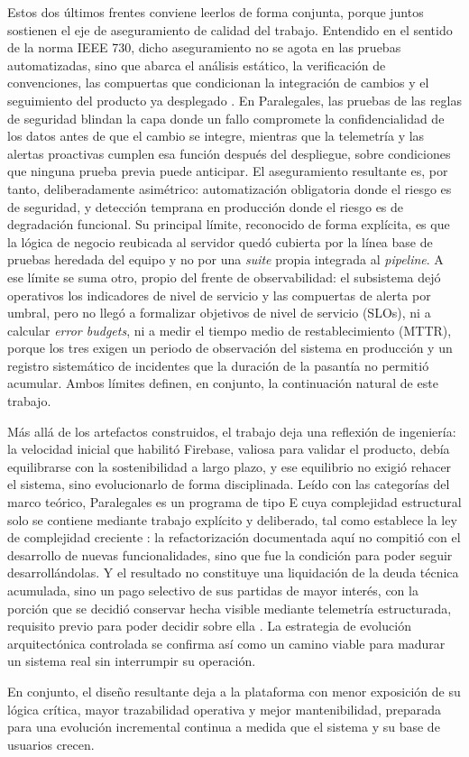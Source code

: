 Estos dos últimos frentes conviene leerlos de forma conjunta, porque juntos sostienen el eje de aseguramiento de calidad del trabajo. Entendido en el sentido de la norma IEEE 730, dicho aseguramiento no se agota en las pruebas automatizadas, sino que abarca el análisis estático, la verificación de convenciones, las compuertas que condicionan la integración de cambios y el seguimiento del producto ya desplegado \cite{IEEE730}. En Paralegales, las pruebas de las reglas de seguridad blindan la capa donde un fallo compromete la confidencialidad de los datos antes de que el cambio se integre, mientras que la telemetría y las alertas proactivas cumplen esa función después del despliegue, sobre condiciones que ninguna prueba previa puede anticipar. El aseguramiento resultante es, por tanto, deliberadamente asimétrico: automatización obligatoria donde el riesgo es de seguridad, y detección temprana en producción donde el riesgo es de degradación funcional. Su principal límite, reconocido de forma explícita, es que la lógica de negocio reubicada al servidor quedó cubierta por la línea base de pruebas heredada del equipo y no por una \textit{suite} propia integrada al \textit{pipeline}. A ese límite se suma otro, propio del frente de observabilidad: el subsistema dejó operativos los indicadores de nivel de servicio y las compuertas de alerta por umbral, pero no llegó a formalizar objetivos de nivel de servicio (SLOs), ni a calcular \textit{error budgets}, ni a medir el tiempo medio de restablecimiento (MTTR), porque los tres exigen un periodo de observación del sistema en producción y un registro sistemático de incidentes que la duración de la pasantía no permitió acumular. Ambos límites definen, en conjunto, la continuación natural de este trabajo.

Más allá de los artefactos construidos, el trabajo deja una reflexión de ingeniería: la velocidad inicial que habilitó Firebase, valiosa para validar el producto, debía equilibrarse con la sostenibilidad a largo plazo, y ese equilibrio no exigió rehacer el sistema, sino evolucionarlo de forma disciplinada. Leído con las categorías del marco teórico, Paralegales es un programa de tipo E cuya complejidad estructural solo se contiene mediante trabajo explícito y deliberado, tal como establece la ley de complejidad creciente \cite{Lehman1980}: la refactorización documentada aquí no compitió con el desarrollo de nuevas funcionalidades, sino que fue la condición para poder seguir desarrollándolas. Y el resultado no constituye una liquidación de la deuda técnica acumulada, sino un pago selectivo de sus partidas de mayor interés, con la porción que se decidió conservar hecha visible mediante telemetría estructurada, requisito previo para poder decidir sobre ella \cite{Kruchten2012}. La estrategia de evolución arquitectónica controlada se confirma así como un camino viable para madurar un sistema real sin interrumpir su operación.

En conjunto, el diseño resultante deja a la plataforma con menor exposición de su lógica crítica, mayor trazabilidad operativa y mejor mantenibilidad, preparada para una evolución incremental continua a medida que el sistema y su base de usuarios crecen.

